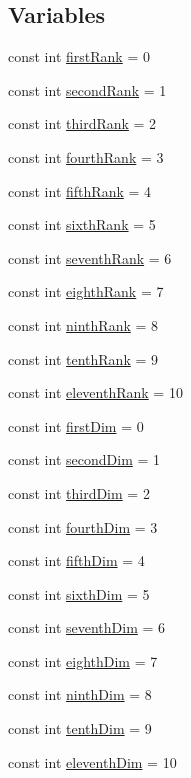 \subsection*{Variables}
\begin{DoxyCompactItemize}
\item 
const int \hyperlink{array-impl_8h_a10fa77141b2ccb1987020012c8968060}{first\+Rank} = 0
\item 
const int \hyperlink{array-impl_8h_a80b19521ce0cdc6058a6e74f4ec23fe1}{second\+Rank} = 1
\item 
const int \hyperlink{array-impl_8h_a6234d233c51516b8ac4efd55bceebab0}{third\+Rank} = 2
\item 
const int \hyperlink{array-impl_8h_a444c9890bbff4c24a863f016eb5807cf}{fourth\+Rank} = 3
\item 
const int \hyperlink{array-impl_8h_a4cda495bd162d9be12babd19baa9a556}{fifth\+Rank} = 4
\item 
const int \hyperlink{array-impl_8h_a946e32a6eb593958f7c32a28a153ce40}{sixth\+Rank} = 5
\item 
const int \hyperlink{array-impl_8h_a3fca1df55adbfa8251489da219ce6e14}{seventh\+Rank} = 6
\item 
const int \hyperlink{array-impl_8h_a4fb3e6a5e3db7aeeed58909a47787c59}{eighth\+Rank} = 7
\item 
const int \hyperlink{array-impl_8h_a591b69aa0470434d784665524a551be8}{ninth\+Rank} = 8
\item 
const int \hyperlink{array-impl_8h_a8606511c19df3f5f3c01d5ba22c9226a}{tenth\+Rank} = 9
\item 
const int \hyperlink{array-impl_8h_a5065eea386c808e4500600470240708a}{eleventh\+Rank} = 10
\item 
const int \hyperlink{array-impl_8h_a0e33e8837ee6b8867d978fe9c3efe885}{first\+Dim} = 0
\item 
const int \hyperlink{array-impl_8h_a518ffae5f2f550d35ec0e2fe7b9856ff}{second\+Dim} = 1
\item 
const int \hyperlink{array-impl_8h_a014c5cae0a66ed35b79c8d1e5e8aa309}{third\+Dim} = 2
\item 
const int \hyperlink{array-impl_8h_a88ddcd456cba203025b1ebce201b2ae5}{fourth\+Dim} = 3
\item 
const int \hyperlink{array-impl_8h_aafec8739c9efb7ba33a9d73d754ca901}{fifth\+Dim} = 4
\item 
const int \hyperlink{array-impl_8h_a09e286be77fa9fa73a5849629e5d33b9}{sixth\+Dim} = 5
\item 
const int \hyperlink{array-impl_8h_ae82f35cbc334ff8aa239b73df4a56814}{seventh\+Dim} = 6
\item 
const int \hyperlink{array-impl_8h_a71fc90c01b3db3416638e71925c3038a}{eighth\+Dim} = 7
\item 
const int \hyperlink{array-impl_8h_a1d015c7d42fc317a351bac33a1c9aee2}{ninth\+Dim} = 8
\item 
const int \hyperlink{array-impl_8h_a33946040ebca5971e44f2abaa2bdc27f}{tenth\+Dim} = 9
\item 
const int \hyperlink{array-impl_8h_a0bac07dc8580219fe495290cb12a0e94}{eleventh\+Dim} = 10
\end{DoxyCompactItemize}


